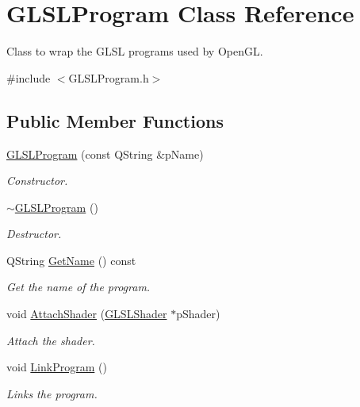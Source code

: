 \hypertarget{class_g_l_s_l_program}{\section{G\+L\+S\+L\+Program Class Reference}
\label{class_g_l_s_l_program}
}


Class to wrap the G\+L\+S\+L programs used by Open\+G\+L.  




{\ttfamily \#include $<$G\+L\+S\+L\+Program.\+h$>$}

\subsection*{Public Member Functions}
\begin{DoxyCompactItemize}
\item 
\hyperlink{class_g_l_s_l_program_a2c3f2dbcdeb7d6d3929b107a29ec67b0}{G\+L\+S\+L\+Program} (const Q\+String \&p\+Name)
\begin{DoxyCompactList}\small\item\em Constructor. \end{DoxyCompactList}\item 
\hyperlink{class_g_l_s_l_program_aec786fecfa03b6aaa3c70f8da3c05a02}{$\sim$\+G\+L\+S\+L\+Program} ()
\begin{DoxyCompactList}\small\item\em Destructor. \end{DoxyCompactList}\item 
Q\+String \hyperlink{class_g_l_s_l_program_a12cd62cad10ad6168138618015c54bb4}{Get\+Name} () const 
\begin{DoxyCompactList}\small\item\em Get the name of the program. \end{DoxyCompactList}\item 
void \hyperlink{class_g_l_s_l_program_a38eec230f09db36fbf4288c2a759bdcc}{Attach\+Shader} (\hyperlink{class_g_l_s_l_shader}{G\+L\+S\+L\+Shader} $\ast$p\+Shader)
\begin{DoxyCompactList}\small\item\em Attach the shader. \end{DoxyCompactList}\item 
void \hyperlink{class_g_l_s_l_program_a97aa67519137e27d89b2f59678cf6fd3}{Link\+Program} ()
\begin{DoxyCompactList}\small\item\em Links the program. \end{DoxyCompactList}\item 

\end{DoxyCompactItemize}
